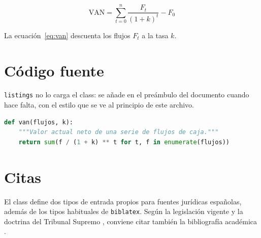 \documentclass[12pt,palatino,nohangbib]{ui1activity}
\begin{document}
\begin{equation}
	\mathrm{VAN} = \sum_{t=0}^{n} \frac{F_t}{(1 + k)^{t}} - F_0
	\label{eq:van}
\end{equation}

La ecuación~\eqref{eq:van} descuenta los flujos \(F_t\) a la tasa \(k\).

\section{Código fuente}

\texttt{listings} no lo carga el class: se añade en el preámbulo del documento
cuando hace falta, con el estilo que se ve al principio de este archivo.

\begin{lstlisting}[language=Python, caption={Cálculo del VAN. / Computing NPV.}]
def van(flujos, k):
    """Valor actual neto de una serie de flujos de caja."""
    return sum(f / (1 + k) ** t for t, f in enumerate(flujos))
\end{lstlisting}

\section{Citas}

El class define dos tipos de entrada propios para fuentes jurídicas españolas,
además de los tipos habituales de \texttt{biblatex}. Según la legislación
vigente \cite{lsc2010} y la doctrina del Tribunal Supremo \cite{sts2020},
conviene citar también la bibliografía académica \cite{sample, knuth}.

\makebibliography
\end{document}
